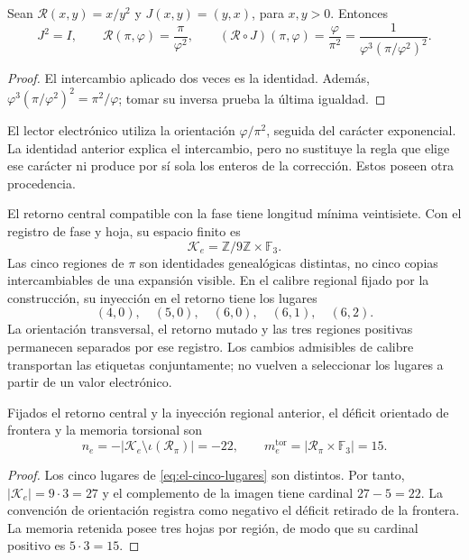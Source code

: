 \begin{lemma}
Sean \(\mathcal R(x,y)=x/y^2\) y \(J(x,y)=(y,x)\), para \(x,y>0\).
Entonces
\begin{equation}
 J^2=I,\qquad
 \mathcal R(\pi,\varphi)=\frac{\pi}{\varphi^2},\qquad
 (\mathcal R\circ J)(\pi,\varphi)=\frac{\varphi}{\pi^2}
 =\frac1{\varphi^3(\pi/\varphi^2)^2}.
 \label{eq:el-bisagra}
\end{equation}
\end{lemma}
\begin{proof}
El intercambio aplicado dos veces es la identidad. Además,
\(\varphi^3(\pi/\varphi^2)^2=\pi^2/\varphi\); tomar su inversa prueba
la última igualdad.
\end{proof}

El lector electrónico utiliza la orientación \(\varphi/\pi^2\),
seguida del carácter exponencial. La identidad anterior explica el
intercambio, pero no sustituye la regla que elige ese carácter ni produce
por sí sola los enteros de la corrección. Estos poseen otra procedencia.

El retorno central compatible con la fase tiene longitud mínima
veintisiete. Con el registro de fase y hoja, su espacio finito es
\[
 \mathcal K_e=\mathbb Z/9\mathbb Z\times\mathbb F_3.
\]
Las cinco regiones de \(\pi\) son identidades genealógicas distintas,
no cinco copias intercambiables de una expansión visible. En el calibre
regional fijado por la construcción, su inyección en el retorno tiene
los lugares
\begin{equation}
 (4,0),\quad(5,0),\quad(6,0),\quad(6,1),\quad(6,2).
 \label{eq:el-cinco-lugares}
\end{equation}
La orientación transversal, el retorno mutado y las tres regiones
positivas permanecen separados por ese registro. Los cambios admisibles
de calibre transportan las etiquetas conjuntamente; no vuelven a
seleccionar los lugares a partir de un valor electrónico.

\begin{proposition}
Fijados el retorno central y la inyección regional anterior, el déficit
orientado de frontera y la memoria torsional son
\begin{equation}
 n_e=-|\mathcal K_e\setminus\iota(\mathscr R_\pi)|=-22,
 \qquad
 m_e^{\mathrm{tor}}=|\mathscr R_\pi\times\mathbb F_3|=15.
 \label{eq:el-selector-enteros}
\end{equation}
\end{proposition}
\begin{proof}
Los cinco lugares de \eqref{eq:el-cinco-lugares} son distintos. Por
tanto, \(|\mathcal K_e|=9\cdot3=27\) y el complemento de la imagen
tiene cardinal \(27-5=22\). La convención de orientación registra como
negativo el déficit retirado de la frontera. La memoria retenida posee
tres hojas por región, de modo que su cardinal positivo es
\(5\cdot3=15\).
\end{proof}

